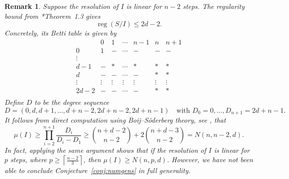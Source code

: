 \documentclass[11pt,letterpaper,reqno]{amsart}
\newcommand{\reg}{\operatorname{reg}}
\newtheorem{remark}[theorem]{Remark}
\theoremstyle{definition}
\numberwithin{equation}{section}
\begin{document}
\begin{remark}
    Suppose the resolution of $I$ is linear for $n-2$ steps. The regularity bound from \cite{yang}*{Theorem~1.3} gives
    \[\reg(S/I) \le 2d-2.\]
    Concretely, its Betti table is given by
    \[
    \begin{array}{c|cccccccccc}
     & 0 & 1 &\cdots & n-1 & n  &n+1\\\hline
     0 & 1 & - &\cdots &- & - &-\\
     \vdots \\
    d-1 & - & \ast & \cdots & \ast & \ast  & \ast\\
    d & - & - & \cdots & - & \ast & \ast\\
    \vdots &\vdots&\vdots&\vdots&\vdots&\vdots & \vdots\\
    2d-2 & - & - & \cdots & - & \ast & \ast\\
    \end{array}
    \]
    Define $D$ to be the degree sequence
    \[D = (0,d,d+1,\dots,d+n-2,2d+n-2,2d+n-1) \quad \text{with }D_0 = 0, \dots,D_{n+1} = 2d+n-1.\]
    It follows from direct computation using Boij--Söderberg theory, see \cite{ES}, that 
    \[\mu(I) \ge \prod_{i = 2}^{n+1}\frac{D_i}{D_i - D_1} \ge \binom{n+d-2}{n-2} + 2\binom{n+d-3}{n-2} = N(n,n-2,d).\]
    In fact, applying the same argument shows that if the resolution of $I$ is linear for $p$ steps, where $p \ge \left \lceil \frac{n-2}{3}\right\rceil$, then $\mu(I) \ge N(n,p,d)$. However, we have not been able to conclude Conjecture~\ref{conj:numgens} in full generality.
\end{remark} 
\end{document}
